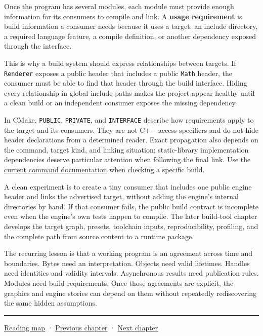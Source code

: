 Once the program has several modules, each module must provide enough information for its consumers to compile and link. A \textbf{\hyperref[appendix-3327b8977adf]{usage requirement}} is build information a consumer needs because it uses a target: an include directory, a required language feature, a compile definition, or another dependency exposed through the interface.

This is why a build system should express relationships between targets. If \texttt{Renderer} exposes a public header that includes a public \texttt{Math} header, the consumer must be able to find that header through the build interface. Hiding every relationship in global include paths makes the project appear healthy until a clean build or an independent consumer exposes the missing dependency.

In CMake, \texttt{PUBLIC}, \texttt{PRIVATE}, and \texttt{INTERFACE} describe how requirements apply to the target and its consumers. They are not C++ access specifiers and do not hide header declarations from a determined reader. Exact propagation also depends on the command, target kind, and linking situation; static-library implementation dependencies deserve particular attention when following the final link. Use the \href{https://cmake.org/cmake/help/latest/command/target_link_libraries.html}{current command documentation} when checking a specific build.

A clean experiment is to create a tiny consumer that includes one public engine header and links the advertised target, without adding the engine's internal directories by hand. If that consumer fails, the public build contract is incomplete even when the engine's own tests happen to compile. The later build-tool chapter develops the target graph, presets, toolchain inputs, reproducibility, profiling, and the complete path from source content to a runtime package.

The recurring lesson is that a working program is an agreement across time and boundaries. Bytes need an interpretation. Objects need valid lifetimes. Handles need identities and validity intervals. Asynchronous results need publication rules. Modules need build requirements. Once those agreements are explicit, the graphics and engine stories can depend on them without repeatedly rediscovering the same hidden assumptions.

\begin{center}\rule{0.5\linewidth}{0.5pt}\end{center}

\hyperref[volume-reading-map]{Reading map} · \hyperref[01-foundations-i-ch008]{Previous chapter} · \hyperref[01-foundations-i-ch010]{Next chapter}
